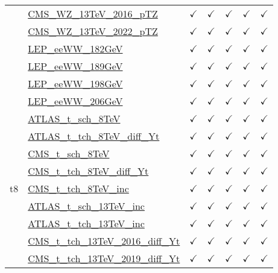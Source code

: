 \documentclass{article}
\begin{document}
\begin{longtable}{|c|l|c|c|c|c|c|}
 & \href{https://arxiv.org}{CMS_WZ_13TeV_2016_pTZ}  & $\checkmark$ & $\checkmark$ & $\checkmark$ & $\checkmark$ & $\checkmark$\\ \cline{2-7}
 & \href{https://arxiv.org}{CMS_WZ_13TeV_2022_pTZ}  & $\checkmark$ & $\checkmark$ & $\checkmark$ & $\checkmark$ & $\checkmark$\\ \cline{2-7}
 & \href{https://arxiv.org}{LEP_eeWW_182GeV}  & $\checkmark$ & $\checkmark$ & $\checkmark$ & $\checkmark$ & $\checkmark$\\ \cline{2-7}
 & \href{https://arxiv.org}{LEP_eeWW_189GeV}  & $\checkmark$ & $\checkmark$ & $\checkmark$ & $\checkmark$ & $\checkmark$\\ \cline{2-7}
 & \href{https://arxiv.org}{LEP_eeWW_198GeV}  & $\checkmark$ & $\checkmark$ & $\checkmark$ & $\checkmark$ & $\checkmark$\\ \cline{2-7}
 & \href{https://arxiv.org}{LEP_eeWW_206GeV}  & $\checkmark$ & $\checkmark$ & $\checkmark$ & $\checkmark$ & $\checkmark$
\\ \hline
\multirow{10}{*}{t8}
 & \href{https://arxiv.org}{ATLAS_t_sch_8TeV}  & $\checkmark$ & $\checkmark$ & $\checkmark$ & $\checkmark$ & $\checkmark$\\ \cline{2-7}
 & \href{https://arxiv.org}{ATLAS_t_tch_8TeV_diff_Yt}  & $\checkmark$ & $\checkmark$ & $\checkmark$ & $\checkmark$ & $\checkmark$\\ \cline{2-7}
 & \href{https://arxiv.org}{CMS_t_sch_8TeV}  & $\checkmark$ & $\checkmark$ & $\checkmark$ & $\checkmark$ & $\checkmark$\\ \cline{2-7}
 & \href{https://arxiv.org}{CMS_t_tch_8TeV_diff_Yt}  & $\checkmark$ & $\checkmark$ & $\checkmark$ & $\checkmark$ & $\checkmark$\\ \cline{2-7}
 & \href{https://arxiv.org}{CMS_t_tch_8TeV_inc}  & $\checkmark$ & $\checkmark$ & $\checkmark$ & $\checkmark$ & $\checkmark$\\ \cline{2-7}
 & \href{https://arxiv.org}{ATLAS_t_sch_13TeV_inc}  & $\checkmark$ & $\checkmark$ & $\checkmark$ & $\checkmark$ & $\checkmark$\\ \cline{2-7}
 & \href{https://arxiv.org}{ATLAS_t_tch_13TeV_inc}  & $\checkmark$ & $\checkmark$ & $\checkmark$ & $\checkmark$ & $\checkmark$\\ \cline{2-7}
 & \href{https://arxiv.org}{CMS_t_tch_13TeV_2016_diff_Yt}  & $\checkmark$ & $\checkmark$ & $\checkmark$ & $\checkmark$ & $\checkmark$\\ \cline{2-7}
 & \href{https://arxiv.org}{CMS_t_tch_13TeV_2019_diff_Yt}  & $\checkmark$ & $\checkmark$ & $\checkmark$ & $\checkmark$ & $\checkmark$\\ \cline{2-7}

\end{longtable}
\end{document}
